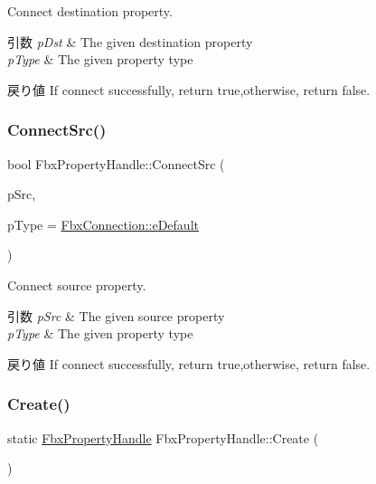 Connect destination property. 
\begin{DoxyParams}{引数}
{\em p\+Dst} & The given destination property \\
\hline
{\em p\+Type} & The given property type \\
\hline
\end{DoxyParams}
\begin{DoxyReturn}{戻り値}
If connect successfully, return true,otherwise, return false. 
\end{DoxyReturn}
\mbox{\label{class_fbx_property_handle_a9682cef8ffadfe43c594a9cf787879b1}} 
\subsubsection{\texorpdfstring{Connect\+Src()}{ConnectSrc()}}
{\footnotesize\ttfamily bool Fbx\+Property\+Handle\+::\+Connect\+Src (\begin{DoxyParamCaption}\item[{const \hyperlink{class_fbx_property_handle}{Fbx\+Property\+Handle} \&}]{p\+Src,  }\item[{const \hyperlink{class_fbx_connection_a3df448a5db356652ab99fd2be2553749}{Fbx\+Connection\+::\+E\+Type}}]{p\+Type = {\ttfamily \hyperlink{class_fbx_connection_a3df448a5db356652ab99fd2be2553749a93ca385d7cc25fef28232a2d10b836e3}{Fbx\+Connection\+::e\+Default}} }\end{DoxyParamCaption})}

Connect source property. 
\begin{DoxyParams}{引数}
{\em p\+Src} & The given source property \\
\hline
{\em p\+Type} & The given property type \\
\hline
\end{DoxyParams}
\begin{DoxyReturn}{戻り値}
If connect successfully, return true,otherwise, return false. 
\end{DoxyReturn}
\mbox{\label{class_fbx_property_handle_a347190a2078177d88598a7cd898eb811}} 
\subsubsection{\texorpdfstring{Create()}{Create()}\hspace{0.1cm}{\footnotesize\ttfamily [1/4]}}
{\footnotesize\ttfamily static \hyperlink{class_fbx_property_handle}{Fbx\+Property\+Handle} Fbx\+Property\+Handle\+::\+Create (\begin{DoxyParamCaption}{ }\end{DoxyParamCaption})\hspace{0.3cm}{\ttfamily [static]}}



